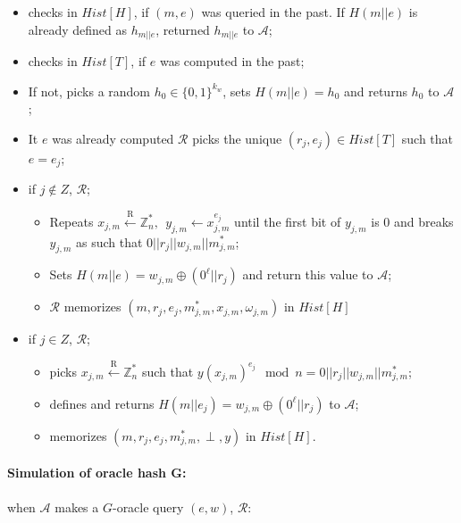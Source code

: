 \documentclass[a4paper,11pt]{article}
\begin{document}
\begin{itemize}

 \item checks in $Hist [H]$, if $(m,e)$ was queried in the past. If $ H(m||e)$ is already defined
   as $h_{m||e}$,  returned $ h_{m||e}$ to $\mathcal{A}$;
 \item checks in $Hist [T]$, if $e$ was  computed in the past;
\item If not, picks a random $h_{0}\in\{0,1\}^{k_w}$, sets  $H(m||e) =h_{0}$ and returns $h_0$  to $\mathcal{A}$;
 \item It $e$ was already computed $\mathcal{R}$ picks the unique $(r_{j},e_{j}) \in Hist[T]$ such that $e=e_{j}$;

 \item if $j \notin Z$, $\mathcal{R}$;
 \begin{itemize}
    \item Repeats $x_{j,m}\overset{\text{R}}{\longleftarrow}\mathbb{Z}_n^*, \ \ y_{j,m}\longleftarrow  x_{j,m}^{e_j}$ until the first bit of  $y_{j,m}$ is 0 and breaks $y_{j,m}$ as  such that $ 0||r_j||w_{j,m}||m^*_{j,m}$;
  \item  Sets $H(m||e)=w_{j,m}\oplus (0^{\ell}||r_j)$ and return this value to $\mathcal{A}$;
  \item    $\mathcal{R}$   memorizes $(m, r_{j}, e_{j}, m^*_{j,m},  x_{j,m},  \omega_{j,m})$ in $Hist [H]$
  \end{itemize}
   \item  if $j \in Z$,  $\mathcal{R}$;
    \begin{itemize}
   \item     picks $x_{j,m}\overset{\text{R}}{\longleftarrow}\mathbb{Z}_n^*$ such that $y(x_{j,m})^{e_{j}} \mod n= 0||r_j||w_{j,m} ||m^*_{j,m} $;
    \item       defines and returns  $H(m||e_{j}) = w_{j,m}\oplus (0^{\ell}||r_{j})$ to $\mathcal{A}$;
    \item     memorizes $(m, r_{j}, e_{j}, m^*_{j,m},  \perp, y)$ in $Hist [H]$.
\end{itemize}

\end{itemize}

\paragraph{Simulation of oracle hash $\mathbf{G}$:}
when $\mathcal{A}$ makes a $G$-oracle query  $(e, w)$, $\mathcal{R}$:
\end{document}
